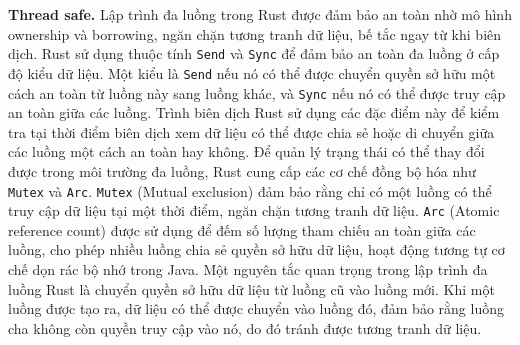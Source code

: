 \textbf{Thread safe.} Lập trình đa luồng trong Rust được đảm bảo an toàn nhờ mô hình ownership và borrowing, ngăn chặn tương tranh dữ liệu, bế tắc ngay từ khi biên dịch.
Rust sử dụng thuộc tính \texttt{Send} và \texttt{Sync} để đảm bảo an toàn đa luồng ở cấp độ kiểu dữ liệu.
Một kiểu là \texttt{Send} nếu nó có thể được chuyển quyền sở hữu một cách an toàn từ luồng này sang luồng khác, và \texttt{Sync} nếu nó có thể được truy cập an toàn giữa các luồng.
Trình biên dịch Rust sử dụng các đặc điểm này để kiểm tra tại thời điểm biên dịch xem dữ liệu có thể được chia sẻ hoặc di chuyển giữa các luồng một cách an toàn hay không.
Để quản lý trạng thái có thể thay đổi được trong môi trường đa luồng, Rust cung cấp các cơ chế đồng bộ hóa như \texttt{Mutex} và \texttt{Arc}.
\texttt{Mutex} (Mutual exclusion) đảm bảo rằng chỉ có một luồng có thể truy cập dữ liệu tại một thời điểm, ngăn chặn tương tranh dữ liệu.
\texttt{Arc} (Atomic reference count) được sử dụng để đếm số lượng tham chiếu an toàn giữa các luồng, cho phép nhiều luồng chia sẻ quyền sở hữu dữ liệu, hoạt động tương tự cơ chế dọn rác bộ nhớ trong Java.
Một nguyên tắc quan trọng trong lập trình đa luồng Rust là chuyển quyền sở hữu dữ liệu từ luồng cũ vào luồng mới.
Khi một luồng được tạo ra, dữ liệu có thể được chuyển vào luồng đó, đảm bảo rằng luồng cha không còn quyền truy cập vào nó, do đó tránh được tương tranh dữ liệu.


